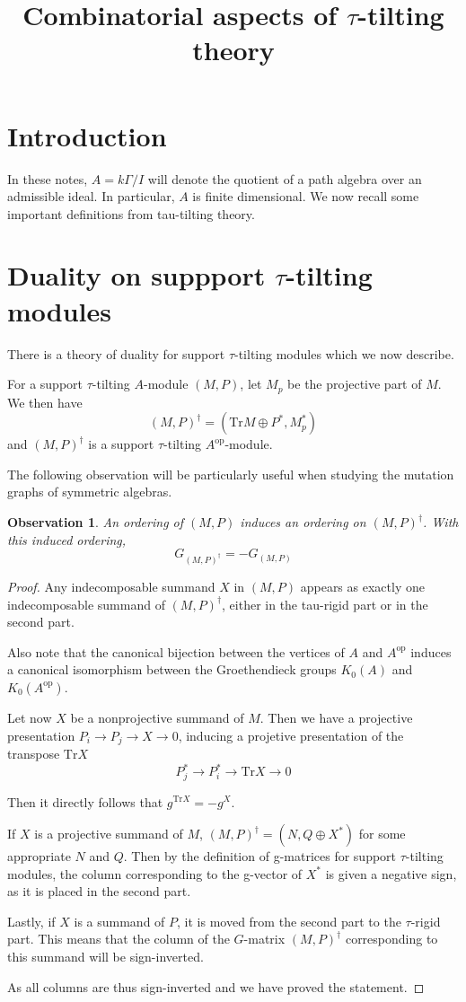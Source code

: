 \documentclass[]{article}
\title{Combinatorial aspects of $\tau$-tilting theory}
\author{}
\newtheorem{obs}{Observation}[section]
\begin{document}
\maketitle

\section{Introduction}
In these notes, $A = k\Gamma/I$ will denote the quotient of a path algebra over an admissible ideal. In particular, $A$ is finite dimensional. We now recall some important definitions from tau-tilting theory.



\section{Duality on suppport $\tau$-tilting modules}
There is a theory of duality for support $\tau$-tilting modules which we now describe.

For a support $\tau$-tilting $A$-module $(M,P)$, let $M_p$ be the projective part of $M$. We then have   
\[(M,P)^\dagger = (\text{Tr}M \oplus P^*, M^*_{p})\] and $(M,P)^\dagger$ is a support $\tau$-tilting $A^{\text{op}}$-module.

The following observation will be particularly useful when studying the mutation graphs of symmetric algebras.
\begin{obs}
	An ordering of $(M,P)$ induces an ordering on $(M,P)^\dagger$. With this induced ordering, \[G_{(M,P)^\dagger} = -G_{(M,P)}  \]
\end{obs}

\begin{proof}
	Any indecomposable summand $X$ in $(M,P)$ appears as exactly one indecomposable summand of $(M,P)^\dagger$, either in the tau-rigid part or in the second part.
	
	Also note that the canonical bijection between the vertices of $A$ and $A^\text{op}$ induces a canonical isomorphism between the Groethendieck groups $K_0(A)$ and $K_0(A^\text{op})$.
	
	Let now $X$ be a nonprojective summand of $M$. Then we have a projective presentation $P_i \rightarrow P_j \rightarrow X \rightarrow 0$, inducing a projetive presentation of the transpose $\text{Tr} X$ \[P_j^* \rightarrow P_i^* \rightarrow \text{Tr} X \rightarrow 0\]
	
	Then it directly follows that $g^{\text{Tr} X} = -g^X$.
	
	If $X$ is a projective summand of $M$, $(M,P)^\dagger = (N,Q \oplus X^*)$ for some appropriate $N$ and $Q$. Then by the definition of g-matrices for support $\tau$-tilting modules, the column corresponding to the g-vector of $X^*$ is given a negative sign, as it is placed in the second part.
	
	Lastly, if $X$ is a summand of $P$, it is moved from the second part to the $\tau$-rigid part. This means that the column of the $G$-matrix $(M,P)^\dagger$ corresponding to this summand will be sign-inverted.
	
	As all columns are thus sign-inverted and we have proved the statement.

\end{proof}
\end{document}

